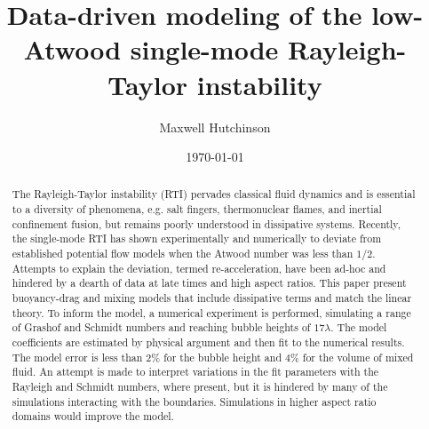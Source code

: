 \documentclass[twocolumn,showpacs,preprintnumbers,amsmath,amssymb,floatfix]{revtex4-1}
\begin{document}
\title{Data-driven modeling of the low-Atwood single-mode Rayleigh-Taylor instability}

\author{Maxwell Hutchinson}

\date{\today}

\begin{abstract}
The Rayleigh-Taylor instability (RTI) pervades classical fluid dynamics and is essential to a diversity of phenomena, e.g. salt fingers, thermonuclear flames, and inertial confinement fusion, but remains poorly understood in dissipative systems.
Recently, the single-mode RTI has shown experimentally and numerically to deviate from established potential flow models when the Atwood number was less than $1/2$.
Attempts to explain the deviation, termed re-acceleration, have been ad-hoc and hindered by a dearth of data at late times and high aspect ratios.
This paper present buoyancy-drag and mixing models that include dissipative terms and match the linear theory.
To inform the model, a numerical experiment is performed, simulating a range of Grashof and Schmidt numbers and reaching bubble heights of $17\lambda$.
The model coefficients are estimated by physical argument and then fit to the numerical results.
The model error is less than 2\% for the bubble height and 4\% for the volume of mixed fluid.
An attempt is made to interpret variations in the fit parameters with the Rayleigh and Schmidt numbers, where present, but it is hindered by many of the simulations interacting with the boundaries.
Simulations in higher aspect ratio domains would improve the model.
\end{abstract}

\pacs{}
\maketitle




\end{document}
